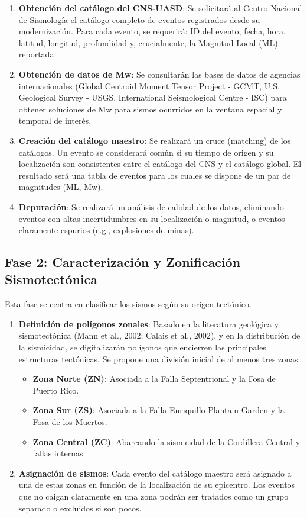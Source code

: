 \documentclass[12pt,a4paper]{article}
\begin{document}
\begin{enumerate}
    \item \textbf{Obtención del catálogo del CNS-UASD}: Se solicitará al Centro Nacional de Sismología el catálogo completo de eventos registrados desde su modernización. Para cada evento, se requerirá: ID del evento, fecha, hora, latitud, longitud, profundidad y, crucialmente, la Magnitud Local (ML) reportada.
    \item \textbf{Obtención de datos de Mw}: Se consultarán las bases de datos de agencias internacionales (Global Centroid Moment Tensor Project - GCMT, U.S. Geological Survey - USGS, International Seismological Centre - ISC) para obtener soluciones de Mw para sismos ocurridos en la ventana espacial y temporal de interés.
    \item \textbf{Creación del catálogo maestro}: Se realizará un cruce (matching) de los catálogos. Un evento se considerará común si su tiempo de origen y su localización son consistentes entre el catálogo del CNS y el catálogo global. El resultado será una tabla de eventos para los cuales se dispone de un par de magnitudes (ML, Mw).
    \item \textbf{Depuración}: Se realizará un análisis de calidad de los datos, eliminando eventos con altas incertidumbres en su localización o magnitud, o eventos claramente espurios (e.g., explosiones de minas).
\end{enumerate}

\subsection{Fase 2: Caracterización y Zonificación Sismotectónica}
Esta fase se centra en clasificar los sismos según su origen tectónico.
\begin{enumerate}
    \item \textbf{Definición de polígonos zonales}: Basado en la literatura geológica y sismotectónica (Mann et al., 2002; Calais et al., 2002), y en la distribución de la sismicidad, se digitalizarán polígonos que encierren las principales estructuras tectónicas. Se propone una división inicial de al menos tres zonas:
        \begin{itemize}
            \item \textbf{Zona Norte (ZN)}: Asociada a la Falla Septentrional y la Fosa de Puerto Rico.
            \item \textbf{Zona Sur (ZS)}: Asociada a la Falla Enriquillo-Plantain Garden y la Fosa de los Muertos.
            \item \textbf{Zona Central (ZC)}: Abarcando la sismicidad de la Cordillera Central y fallas internas.
        \end{itemize}
    \item \textbf{Asignación de sismos}: Cada evento del catálogo maestro será asignado a una de estas zonas en función de la localización de su epicentro. Los eventos que no caigan claramente en una zona podrán ser tratados como un grupo separado o excluidos si son pocos.
\end{enumerate}
\end{document}
